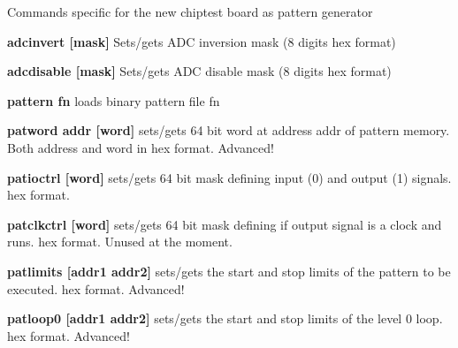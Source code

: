 Commands specific for the new chiptest board as pattern generator


\begin{DoxyItemize}
\item {\bfseries adcinvert \mbox{[}mask\mbox{]}} Sets/gets ADC inversion mask (8 digits hex format)
\end{DoxyItemize}


\begin{DoxyItemize}
\item {\bfseries adcdisable \mbox{[}mask\mbox{]}} Sets/gets ADC disable mask (8 digits hex format)
\end{DoxyItemize}


\begin{DoxyItemize}
\item {\bfseries pattern fn} loads binary pattern file fn
\end{DoxyItemize}


\begin{DoxyItemize}
\item {\bfseries patword addr \mbox{[}word\mbox{]}} sets/gets 64 bit word at address addr of pattern memory. Both address and word in hex format. Advanced!
\end{DoxyItemize}


\begin{DoxyItemize}
\item {\bfseries patioctrl \mbox{[}word\mbox{]}} sets/gets 64 bit mask defining input (0) and output (1) signals. hex format.
\end{DoxyItemize}


\begin{DoxyItemize}
\item {\bfseries patclkctrl \mbox{[}word\mbox{]}} sets/gets 64 bit mask defining if output signal is a clock and runs. hex format. Unused at the moment.
\end{DoxyItemize}


\begin{DoxyItemize}
\item {\bfseries patlimits \mbox{[}addr1 addr2\mbox{]}} sets/gets the start and stop limits of the pattern to be executed. hex format. Advanced!
\end{DoxyItemize}


\begin{DoxyItemize}
\item {\bfseries patloop0 \mbox{[}addr1 addr2\mbox{]}} sets/gets the start and stop limits of the level 0 loop. hex format. Advanced!
\end{DoxyItemize}


